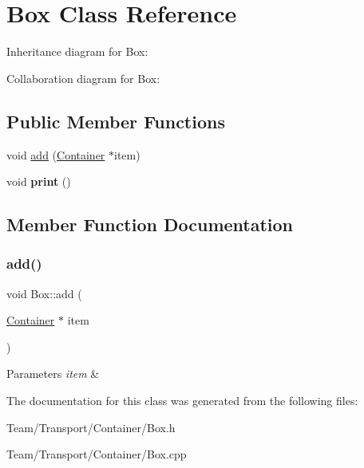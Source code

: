 \hypertarget{classBox}{}\section{Box Class Reference}
\label{classBox}


Inheritance diagram for Box\+:


Collaboration diagram for Box\+:
\subsection*{Public Member Functions}
\begin{DoxyCompactItemize}
\item 
void \hyperlink{classBox_ab556d9a17e15a4a23d7f0950799f1525}{add} (\hyperlink{classContainer}{Container} $\ast$item)
\item 
\mbox{\label{classBox_a7f9cef3d9324289ae0fb4ec1aa50db9d}} 
void {\bfseries print} ()
\end{DoxyCompactItemize}


\subsection{Member Function Documentation}
\mbox{\label{classBox_ab556d9a17e15a4a23d7f0950799f1525}} 
\subsubsection{\texorpdfstring{add()}{add()}}
{\footnotesize\ttfamily void Box\+::add (\begin{DoxyParamCaption}\item[{\hyperlink{classContainer}{Container} $\ast$}]{item }\end{DoxyParamCaption})}


\begin{DoxyParams}{Parameters}
{\em item} & \\
\hline
\end{DoxyParams}


The documentation for this class was generated from the following files\+:\begin{DoxyCompactItemize}
\item 
Team/\+Transport/\+Container/Box.\+h\item 
Team/\+Transport/\+Container/Box.\+cpp\end{DoxyCompactItemize}
